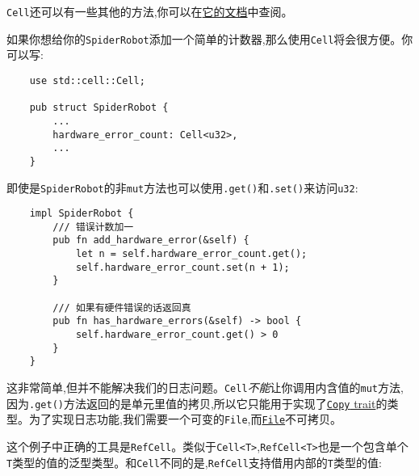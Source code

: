 \texttt{Cell}还可以有一些其他的方法,你可以在\href{https://doc.rust-lang.org/std/cell/struct.Cell.html}{它的文档}中查阅。

如果你想给你的\texttt{SpiderRobot}添加一个简单的计数器,那么使用\texttt{Cell}将会很方便。你可以写:
\begin{verbatim}
    use std::cell::Cell;

    pub struct SpiderRobot {
        ...
        hardware_error_count: Cell<u32>,
        ...
    }
\end{verbatim}

即使是\texttt{SpiderRobot}的非\texttt{mut}方法也可以使用\texttt{.get()}和\texttt{.set()}来访问\texttt{u32}:
\begin{verbatim}
    impl SpiderRobot {
        /// 错误计数加一
        pub fn add_hardware_error(&self) {
            let n = self.hardware_error_count.get();
            self.hardware_error_count.set(n + 1);
        }

        /// 如果有硬件错误的话返回真
        pub fn has_hardware_errors(&self) -> bool {
            self.hardware_error_count.get() > 0
        }
    }
\end{verbatim}

这非常简单,但并不能解决我们的日志问题。\texttt{Cell}\emph{不能}让你调用内含值的\texttt{mut}方法,因为\texttt{.get()}方法返回的是单元里值的拷贝,所以它只能用于实现了\hyperref[copy]{\texttt{Copy} trait}的类型。为了实现日志功能,我们需要一个可变的\texttt{File},而\hyperref[file]{\texttt{File}}不可拷贝。

这个例子中正确的工具是\texttt{RefCell}。类似于\texttt{Cell<T>},\texttt{RefCell<T>}也是一个包含单个\texttt{T}类型的值的泛型类型。和\texttt{Cell}不同的是,\texttt{RefCell}支持借用内部的\texttt{T}类型的值:





